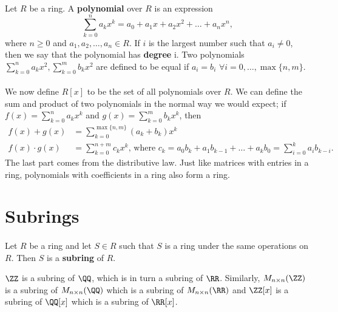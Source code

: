 \documentclass[../abstract_algebra.tex]{subfiles}
\begin{document}
        \begin{example}
            Let $R$ be a ring. A \textbf{polynomial} over $R$ is an expression
            \begin{equation}
                \sum_{k=0}^{n}a_kx^k=a_0+a_1x+a_2x^2+\dots+a_nx^n,
            \end{equation}
            where $n\geq0$ and $a_1,a_2,\dots,a_n\in R$.
            If $i$ is the largest number such that $a_i\neq0$, then we say that the polynomial has \textbf{degree} i.
            Two polynomials $\sum_{k=0}^{n}a_kx^2,\sum_{k=0}^{m}b_kx^2$ are defined to be equal if $a_i=b_i$ $\forall i=0,\dots,\max\{n,m\}$.

            \paragraph{}
            We now define $R[x]$ to be the set of all polynomials over $R$.
            We can define the sum and product of two polynomials in the normal way we would expect; if $f(x)=\sum_{k=0}^{n}a_kx^k$ and $g(x)=\sum_{k=0}^{m}b_kx^k$, then
            \begin{align}
                f(x)+g(x)&=\sum_{k=0}^{\max\{n,m\}}(a_k+b_k)x^k\\
                f(x)\cdot g(x)&=\sum_{k=0}^{n+m}c_kx^k\text{, where } c_k=a_0b_k+a_1b_{k-1}+\dots+a_kb_0=\sum_{i=0}^{k}a_ib_{k-i}.
            \end{align}
            The last part comes from the distributive law.
            Just like matrices with entries in a ring, polynomials with coefficients in a ring also form a ring.
        \end{example}

    \section{Subrings}
        \paragraph{}
        Let $R$ be a ring and let $S\in R$ such that $S$ is a ring under the same operations on $R$.
        Then $S$ is a \textbf{subring} of $R$.

        \begin{example}
            $\ZZ$ is a subring of $\QQ$, which is in turn a subring of $\RR$.
            Similarly, $M_{n\times n}(\ZZ)$ is a subring of $M_{n\times n}(\QQ)$ which is a subring of $M_{n\times n}(\RR)$ and $\ZZ[x]$ is a subring of $\QQ[x]$ which is a subring of $\RR[x]$.
        \end{example}
\end{document}
